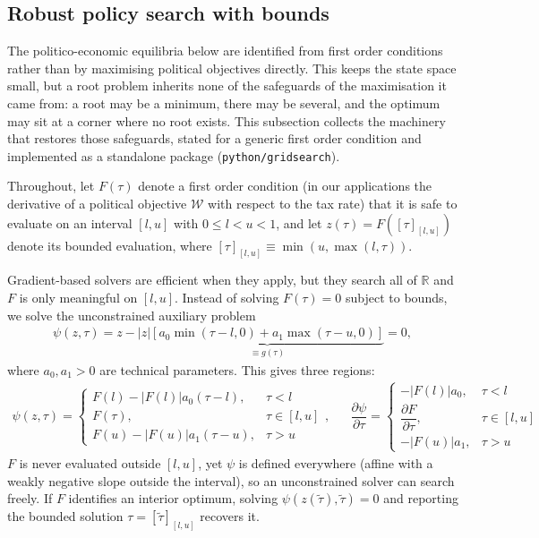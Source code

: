 \subsection{Robust policy search with bounds}\label{\refsec:RobustRoot}
The politico-economic equilibria below are identified from first order conditions rather than by maximising political objectives directly. This keeps the state space small, but a root problem inherits none of the safeguards of the maximisation it came from: a root may be a minimum, there may be several, and the optimum may sit at a corner where no root exists. This subsection collects the machinery that restores those safeguards, stated for a generic first order condition and implemented as a standalone package (\texttt{python/gridsearch}).

Throughout, let $F(\tau)$ denote a first order condition (in our applications the derivative of a political objective $\mathcal{W}$ with respect to the tax rate) that it is safe to evaluate on an interval $[l,u]$ with $0\leq l < u < 1$, and let $z(\tau) = F\left([\tau]_{[l,u]}\right)$ denote its bounded evaluation, where $[\tau]_{[l,u]} \equiv \min(u, \max(l,\tau))$.

Gradient-based solvers are efficient when they apply, but they search all of $\mathbb{R}$ and $F$ is only meaningful on $[l,u]$. Instead of solving $F(\tau) = 0$ subject to bounds, we solve the unconstrained auxiliary problem
\begin{align}\label{\refeq:root}
    \psi(z,\tau) = z - |z| \underbrace{\left[a_0\min\left(\tau - l,0\right) + a_1\max\left(\tau - u, 0\right)\right]}_{\equiv g(\tau)} = 0,
\end{align}
where $a_0, a_1>0$ are technical parameters. This gives three regions:
\begin{align*}
    \psi\left(z,\tau\right) = \left\lbrace \begin{array}{ll} F(l)-|F(l)| a_0 (\tau - l), & \tau<l \\
    F(\tau), & \tau\in[l,u] \\
    F(u)-|F(u)|a_1(\tau-u), & \tau>u\end{array}\right., && \dfrac{\partial \psi}{\partial \tau} = \left\lbrace \begin{array}{ll} -|F(l)|a_0, & \tau<l \\
    \dfrac{\partial F}{\partial \tau}, & \tau\in[l,u] \\
    -|F(u)|a_1, & \tau>u\end{array}\right.
\end{align*}
$F$ is never evaluated outside $[l,u]$, yet $\psi$ is defined everywhere (affine with a weakly negative slope outside the interval), so an unconstrained solver can search freely. If $F$ identifies an interior optimum, solving $\psi\left(z(\tilde{\tau}),\tilde{\tau}\right) = 0$ and reporting the bounded solution $\tau = [\tilde{\tau}]_{[l,u]}$ recovers it.

